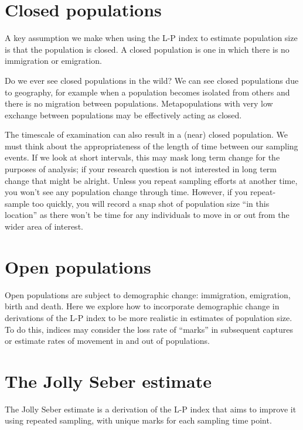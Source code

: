 \documentclass[
  letterpaper,
  DIV=11,
  numbers=noendperiod]{scrreprt}
\begin{document}
\section{Closed populations}\label{closed-populations}

A key assumption we make when using the L-P index to estimate population
size is that the population is closed. A closed population is one in
which there is no immigration or emigration.

Do we ever see closed populations in the wild? We can see closed
populations due to geography, for example when a population becomes
isolated from others and there is no migration between populations.
Metapopulations with very low exchange between populations may be
effectively acting as closed.

The timescale of examination can also result in a (near) closed
population. We must think about the appropriateness of the length of
time between our sampling events. If we look at short intervals, this
may mask long term change for the purposes of analysis; if your research
question is not interested in long term change that might be alright.
Unless you repeat sampling efforts at another time, you won't see any
population change through time. However, if you repeat-sample too
quickly, you will record a snap shot of population size ``in this
location'' as there won't be time for any individuals to move in or out
from the wider area of interest.

\section{Open populations}\label{open-populations}

Open populations are subject to demographic change: immigration,
emigration, birth and death. Here we explore how to incorporate
demographic change in derivations of the L-P index to be more realistic
in estimates of population size. To do this, indices may consider the
loss rate of ``marks'' in subsequent captures or estimate rates of
movement in and out of populations.

\section{The Jolly Seber estimate}\label{the-jolly-seber-estimate}

The Jolly Seber estimate is a derivation of the L-P index that aims to
improve it using repeated sampling, with unique marks for each sampling
time point.
\end{document}
